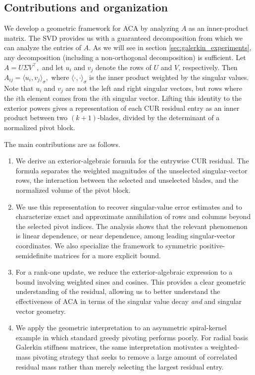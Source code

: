\documentclass[11pt, preprint]{article}
\begin{document}
\subsection{Contributions and organization}

We develop a geometric framework for ACA by analyzing $A$ as an inner-product matrix. The SVD provides us with a guaranteed decomposition from which we can analyze the entries of $A$. As we will see in section \ref{sec:galerkin_experiments}, any decomposition (including a non-orthogonal decomposition) is sufficient. Let
\(    A=U\Sigma V^\top,
\)
and let $u_i$ and $v_j$ denote the rows of $U$ and $V$, respectively. Then \(  A_{ij}=\langle u_i,v_j\rangle_\sigma,\) where $\langle\cdot,\cdot\rangle_\sigma$ is the inner product weighted by the singular values. Note that $u_i$ and $v_j$ are not the left and right singular vectors, but rows where the $i$th element comes from the $i$th singular vector. Lifting this identity to the exterior powers gives a
representation of each CUR residual entry as an inner product between two
$(k+1)$-blades, divided by the determinant of a normalized pivot block.

The main contributions are as follows.
\begin{enumerate}
    \item
    We derive an exterior-algebraic formula for the entrywise CUR residual.
    The formula separates the weighted magnitudes of the unselected
    singular-vector rows, the interaction between the selected and
    unselected blades, and the normalized volume of the pivot block.

    \item
    We use this representation to recover singular-value error estimates and
    to characterize exact and approximate annihilation of rows and columns
    beyond the selected pivot indices. The analysis shows that the relevant
    phenomenon is linear dependence, or near dependence, among leading
    singular-vector coordinates. We also specialize the framework to symmetric
    positive-semidefinite matrices for a more explicit bound.

    \item
    For a rank-one update, we reduce the exterior-algebraic expression to a
    bound involving weighted sines and cosines. This provides a clear geometric understanding of the residual, allowing us to better understand the effectiveness of ACA in terms of the singular value decay \textit{and} and singular vector geometry. 

    \item
    We apply the geometric interpretation to an asymmetric spiral-kernel
    example in which standard greedy pivoting performs poorly. For radial
    basis Galerkin stiffness matrices, the same interpretation motivates a
    weighted-mass pivoting strategy that seeks to remove a large amount of
    correlated residual mass rather than merely selecting the largest
    residual entry.
\end{enumerate}
\end{document}
